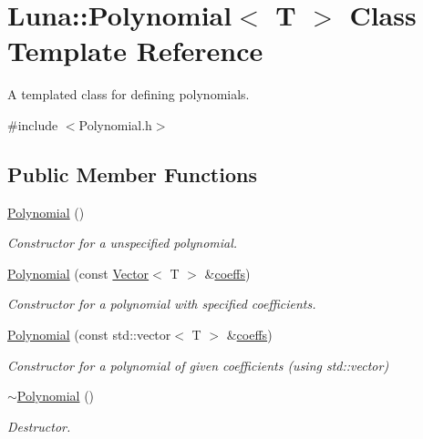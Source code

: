 \hypertarget{classLuna_1_1Polynomial}{}\section{Luna\+:\+:Polynomial$<$ T $>$ Class Template Reference}
\label{classLuna_1_1Polynomial}


A templated class for defining polynomials.  




{\ttfamily \#include $<$Polynomial.\+h$>$}

\subsection*{Public Member Functions}
\begin{DoxyCompactItemize}
\item 
\hyperlink{classLuna_1_1Polynomial_a8b01fe12cd6dcc7191b462d7108ba810}{Polynomial} ()
\begin{DoxyCompactList}\small\item\em Constructor for a unspecified polynomial. \end{DoxyCompactList}\item 
\hyperlink{classLuna_1_1Polynomial_a43e11c981ef0dedc43b39dac6f375639}{Polynomial} (const \hyperlink{classLuna_1_1Vector}{Vector}$<$ T $>$ \&\hyperlink{classLuna_1_1Polynomial_ab5e966c308b7e66d9c1c20666926db34}{coeffs})
\begin{DoxyCompactList}\small\item\em Constructor for a polynomial with specified coefficients. \end{DoxyCompactList}\item 
\hyperlink{classLuna_1_1Polynomial_aca8fea74bbfd5f7ab14c96cd2e4d1693}{Polynomial} (const std\+::vector$<$ T $>$ \&\hyperlink{classLuna_1_1Polynomial_ab5e966c308b7e66d9c1c20666926db34}{coeffs})
\begin{DoxyCompactList}\small\item\em Constructor for a polynomial of given coefficients (using std\+::vector) \end{DoxyCompactList}\item 
\hyperlink{classLuna_1_1Polynomial_ac43f479d0a2a0519e059d2ad942ead9b}{$\sim$\+Polynomial} ()
\begin{DoxyCompactList}\small\item\em Destructor. \end{DoxyCompactList}\item 

\end{DoxyCompactItemize}
